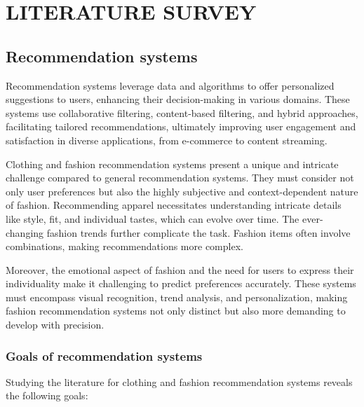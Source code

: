 \chapter[Literature Survey]{LITERATURE SURVEY}

\section{Recommendation systems}
	Recommendation systems leverage data and algorithms to offer personalized suggestions to users, enhancing their decision-making in various domains. These systems use collaborative filtering, content-based filtering, and hybrid approaches, facilitating tailored recommendations, ultimately improving user engagement and satisfaction in diverse applications, from e-commerce to content streaming.

	Clothing and fashion recommendation systems present a unique and intricate challenge compared to general recommendation systems. They must consider not only user preferences but also the highly subjective and context-dependent nature of fashion. Recommending apparel necessitates understanding intricate details like style, fit, and individual tastes, which can evolve over time. The ever-changing fashion trends further complicate the task. Fashion items often involve combinations, making recommendations more complex.

	Moreover, the emotional aspect of fashion and the need for users to express their individuality make it challenging to predict preferences accurately. These systems must encompass visual recognition, trend analysis, and personalization, making fashion recommendation systems not only distinct but also more demanding to develop with precision.

	\subsection{Goals of recommendation systems}
		Studying the literature for clothing and fashion recommendation systems reveals the following goals:

